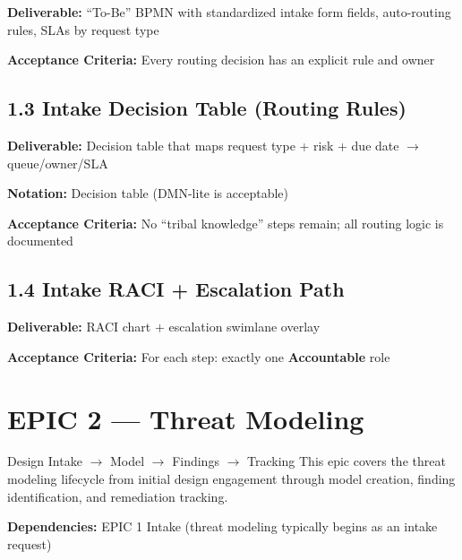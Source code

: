 \documentclass[11pt,letterpaper]{article}
\newcommand{\storyfield}[2]{\textbf{#1:} #2}
\begin{document}
\begin{storycard}
\storyfield{Deliverable}{``To-Be'' BPMN with standardized intake form fields, auto-routing rules, SLAs by request type}

\storyfield{Acceptance Criteria}{Every routing decision has an explicit rule and owner}
\end{storycard}

\subsection{1.3 Intake Decision Table (Routing Rules)}

\begin{storycard}
\storyfield{Deliverable}{Decision table that maps request type + risk + due date $\rightarrow$ queue/owner/SLA}

\storyfield{Notation}{Decision table (DMN-lite is acceptable)}

\storyfield{Acceptance Criteria}{No ``tribal knowledge'' steps remain; all routing logic is documented}
\end{storycard}

\subsection{1.4 Intake RACI + Escalation Path}

\begin{storycard}
\storyfield{Deliverable}{RACI chart + escalation swimlane overlay}

\storyfield{Acceptance Criteria}{For each step: exactly one \textbf{Accountable} role}
\end{storycard}

\newpage

\section{EPIC 2 --- Threat Modeling}

\begin{epicbox}{Design Intake $\rightarrow$ Model $\rightarrow$ Findings $\rightarrow$ Tracking}
This epic covers the threat modeling lifecycle from initial design engagement through model creation, finding identification, and remediation tracking.

\textbf{Dependencies:} EPIC 1 Intake (threat modeling typically begins as an intake request)
\end{epicbox}
\end{document}
